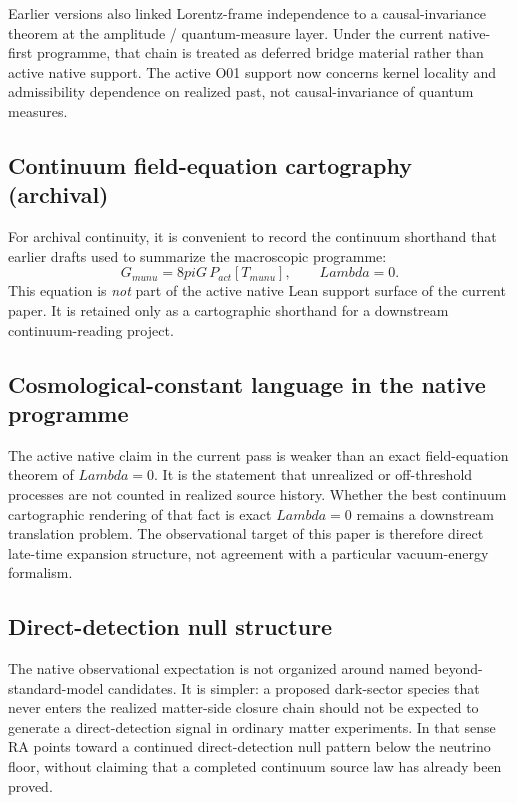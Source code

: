 \documentclass[11pt]{article}
\def\Lambda{Lambda}%
\def\mu{mu}%
\def\nu{nu}%
\def\pi{pi}%
\def\mathrm#1{#1}%
\begin{document}
Earlier versions also linked Lorentz-frame independence to a causal-invariance theorem at the amplitude / quantum-measure layer. Under the current native-first programme, that chain is treated as deferred bridge material rather than active native support. The active O01 support now concerns kernel locality and admissibility dependence on realized past, not causal-invariance of quantum measures.

\subsection{Continuum field-equation cartography (archival)}
\label{sec:uniqueness}

For archival continuity, it is convenient to record the continuum shorthand that earlier drafts used to summarize the macroscopic programme:
\begin{equation}
\label{eq:einstein}
\boxed{G_{\mu\nu} = 8\pi G\, P_{\mathrm{act}}[T_{\mu\nu}], \qquad \Lambda = 0.}
\end{equation}
This equation is \emph{not} part of the active native Lean support surface of the current paper. It is retained only as a cartographic shorthand for a downstream continuum-reading project.

\subsection{Cosmological-constant language in the native programme}
\label{sec:lambda_zero}

The active native claim in the current pass is weaker than an exact field-equation theorem of $\Lambda=0$. It is the statement that unrealized or off-threshold processes are not counted in realized source history. Whether the best continuum cartographic rendering of that fact is exact $\Lambda=0$ remains a downstream translation problem. The observational target of this paper is therefore direct late-time expansion structure, not agreement with a particular vacuum-energy formalism.

\subsection{Direct-detection null structure}

The native observational expectation is not organized around named beyond-standard-model candidates. It is simpler: a proposed dark-sector species that never enters the realized matter-side closure chain should not be expected to generate a direct-detection signal in ordinary matter experiments. In that sense RA points toward a continued direct-detection null pattern below the neutrino floor, without claiming that a completed continuum source law has already been proved.
\end{document}
